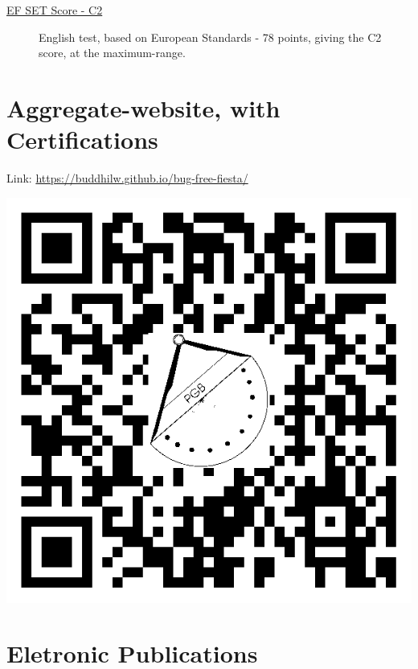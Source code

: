 \documentclass[letterpaper]{../cls/twentysecondcvenglish} %
\begin{document}
\begin{description}
\item[\href{https://buddhilw.github.io/bug-free-fiesta/}{EF SET Score - C2}] English test, based on European Standards - 78 points, giving the C2 score, at the maximum-range.
\end{description}


\vspace{5mm}
\section{Aggregate-website, with Certifications}

\vspace{1mm}

\begin{center}
  Link: \href{https://buddhilw.github.io/bug-free-fiesta/}{https://buddhilw.github.io/bug-free-fiesta/}
\vspace{1mm}

\includegraphics[width=\imagewidth]{../img/virtcerts.png}
\end{center}
\newpage
\makeprofileNoExtra

\section{Eletronic Publications}
\end{document}
